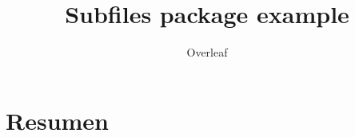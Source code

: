 \documentclass{article}
\title{Subfiles package example}
\author{Overleaf}
\date{ }
\begin{document}
\maketitle

\printindex



\section{Resumen}

\end{document}
